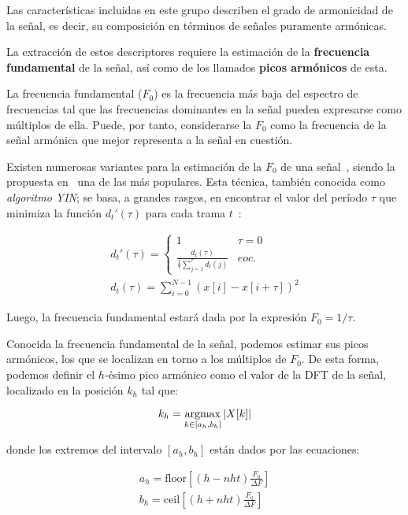 Las características incluidas en este grupo describen el grado de armonicidad de la señal, es decir, su composición en términos de señales puramente armónicas.

La extracción de estos descriptores requiere la estimación de la \textbf{frecuencia fundamental} de la señal, así como de los llamados \textbf{picos armónicos} de esta.

La frecuencia fundamental ($F_0$) es la frecuencia más baja del espectro de frecuencias tal que las frecuencias dominantes en la señal pueden expresarse como múltiplos de ella.
Puede, por tanto, considerarse la $F_0$ como la frecuencia de la señal armónica que mejor representa a la señal en cuestión.

Existen numerosas variantes para la estimación de la $F_0$ de una señal~\cite{Kim05}, siendo la propuesta en~\cite{Cheveigne02} una de las más populares.
Esta técnica, también conocida como \textit{algoritmo YIN};
se basa, a grandes rasgos, en encontrar el valor del período $\tau$ que minimiza la función $d_t'(\tau)$ para cada trama $t$~\cite{Gerhard03-2}:

\begin{gather}
    \label{eq:YIN}
    d_t'(\tau) = \begin{cases}
                     1 & \tau = 0 \\
                     \frac{d_t(\tau)}{\frac{1}{\tau}{\sum_{j=1}^{\tau}{d_t(j)}}} & eoc.
    \end{cases}\\
    d_t(\tau) = \sum_{i=0}^{N-1}{(x[i]-x[i+\tau])^2}
\end{gather}

Luego, la frecuencia fundamental estará dada por la expresión $F_0 = 1/\tau$.

Conocida la frecuencia fundamental de la señal, podemos estimar sus picos armónicos, los que se localizan en torno a los múltiplos de $F_0$.
De esta forma, podemos definir el $h$-ésimo pico armónico como el valor de la DFT de la señal, localizado en la posición $k_h$ tal que:

\begin{equation}
    \label{eq:harmonicPeaks}
    k_h = \operatorname*{argmax}_{k\in [a_h,b_h]}|X[k]|
\end{equation}

\noindent
donde los extremos del intervalo $[a_h, b_h]$ están dados por las ecuaciones:

\begin{gather*}
    a_h = \text{floor}\left[ (h - nht)\frac{F_0}{\Delta F} \right] \\
    b_h = \text{ceil}\left[ (h + nht)\frac{F_0}{\Delta F} \right]
\end{gather*}

